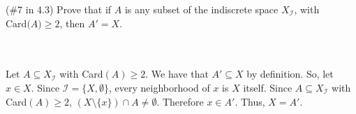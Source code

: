 (\#7 in 4.3) Prove that if $A$ is any subset of the indiscrete space $X_{\mathcal{I}}$, with
$\text{Card($A$)}\geq 2$, then $A' = X$.\\\\

\begin{solution}\renewcommand{\qedsymbol}{}\ \\
    Let $A\subseteq X_{\mathcal{I}}$ with Card$(A)\geq2$. We have that $A'\subseteq X$ by definition.
    So, let $x\in X$. Since $\mathcal{I}=\{X,\emptyset\}$, every neighborhood of $x$ is $X$ itself.
    Since $A\subseteq X_{\mathcal{I}}$ with Card$(A)\geq2$, $(X\setminus\{x\})\cap A\neq\emptyset$.
    Therefore $x\in A'$. Thus, $X=A'$.

\end{solution}